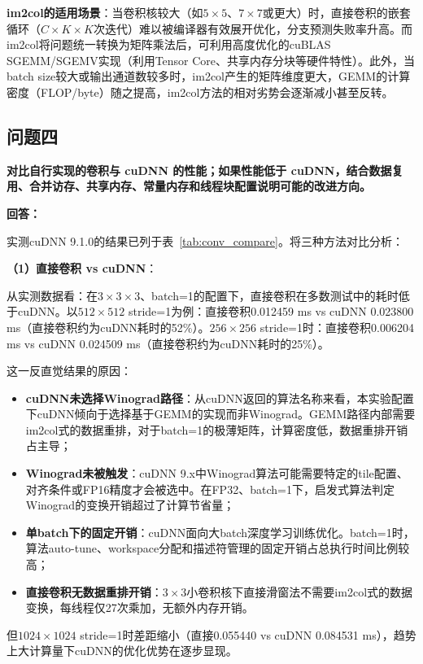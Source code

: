 \documentclass{SYSUReport}
\begin{document}
\textbf{im2col的适用场景}：当卷积核较大（如$5\times5$、$7\times7$或更大）时，直接卷积的嵌套循环（$C\times K\times K$次迭代）难以被编译器有效展开优化，分支预测失败率升高。而im2col将问题统一转换为矩阵乘法后，可利用高度优化的cuBLAS SGEMM/SGEMV实现（利用Tensor Core、共享内存分块等硬件特性）。此外，当batch size较大或输出通道数较多时，im2col产生的矩阵维度更大，GEMM的计算密度（FLOP/byte）随之提高，im2col方法的相对劣势会逐渐减小甚至反转。

\subsection{问题四}

\textbf{对比自行实现的卷积与 cuDNN 的性能；如果性能低于 cuDNN，结合数据复用、合并访存、共享内存、常量内存和线程块配置说明可能的改进方向。}

\textbf{回答：}

实测cuDNN 9.1.0的结果已列于表~\ref{tab:conv_compare}。将三种方法对比分析：

\textbf{（1）直接卷积 vs cuDNN}：

从实测数据看：在$3\times3\times3$、batch=1的配置下，直接卷积在多数测试中的耗时低于cuDNN。以$512\times512$ stride=1为例：直接卷积0.012459 ms vs cuDNN 0.023800 ms（直接卷积约为cuDNN耗时的52\%）。$256\times256$ stride=1时：直接卷积0.006204 ms vs cuDNN 0.024509 ms（直接卷积约为cuDNN耗时的25\%）。

这一反直觉结果的原因：
\begin{itemize}
    \item \textbf{cuDNN未选择Winograd路径}：从cuDNN返回的算法名称来看，本实验配置下cuDNN倾向于选择基于GEMM的实现而非Winograd。GEMM路径内部需要im2col式的数据重排，对于batch=1的极薄矩阵，计算密度低，数据重排开销占主导；
    \item \textbf{Winograd未被触发}：cuDNN 9.x中Winograd算法可能需要特定的tile配置、对齐条件或FP16精度才会被选中。在FP32、batch=1下，启发式算法判定Winograd的变换开销超过了计算节省量；
    \item \textbf{单batch下的固定开销}：cuDNN面向大batch深度学习训练优化。batch=1时，算法auto-tune、workspace分配和描述符管理的固定开销占总执行时间比例较高；
    \item \textbf{直接卷积无数据重排开销}：$3\times3$小卷积核下直接滑窗法不需要im2col式的数据变换，每线程仅27次乘加，无额外内存开销。
\end{itemize}

但$1024\times1024$ stride=1时差距缩小（直接0.055440 vs cuDNN 0.084531 ms），趋势上大计算量下cuDNN的优化优势在逐步显现。
\end{document}
